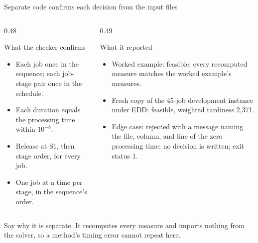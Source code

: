\documentclass[aspectratio=169,11pt]{beamer}
\renewcommand{\fine}{\unskip\space}
\newcommand{\point}[2]{\par\medskip\sumpara #1\sumparaend
  {\color{uablue}\fin #2\fine}\par}
\begin{document}
\begin{frame}{Separate code confirms each decision from the input files}
\begin{columns}[T,onlytextwidth]
\begin{column}{0.48\textwidth}
\begin{block}{What the checker confirms}
\footnotesize
\begin{itemize}
\item Each job once in the sequence; each job-stage pair once in the schedule.
\item Each duration equals the processing time within $10^{-8}$.
\item Release at S1, then stage order, for every job.
\item One job at a time per stage, in the sequence's order.
\end{itemize}
\end{block}
\end{column}
\begin{column}{0.49\textwidth}
\begin{block}{What it reported}
\footnotesize
\begin{itemize}
\item Worked example: feasible; every recomputed measure matches the worked example's measures.
\item Fresh copy of the 45-job development instance under EDD: feasible, weighted tardiness 2,371.
\item Edge case: rejected with a message naming the file, column, and line of the zero processing time; no decision is written; exit status 1.
\end{itemize}
\end{block}
\end{column}
\end{columns}
\point{Say why it is separate.}{It recomputes every measure and imports nothing from the solver, so a method's timing error cannot repeat here.}
\end{frame}
\end{document}
